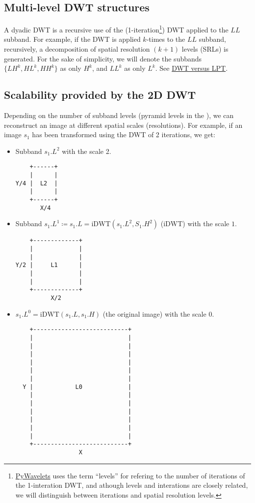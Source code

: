 \subsection{Multi-level DWT structures}
A dyadic DWT is a recursive use of the
(1-iteration\footnote{\href{https://pywavelets.readthedocs.io/en/latest/index.html}{PyWavelets}
  uses the term ``levels'' for refering to the number of iterations of
  the 1-interation DWT, and athough levels and interations are closely
  related, we will distinguish between iterations and spatial
  resolution levels.}) DWT applied to the $LL$ subband. For example,
if the DWT is applied $k$-times to the $LL$ subband, recursively, a
decomposition of spatial resolution $(k+1)$ levels (SRLs) is generated. For
the sake of simplicity, we will denote the subbands $\{LH^k, HL^k,
HH^k\}$ as only $H^k$, and $LL^k$ as only $L^k$. See
\href{https://nbviewer.jupyter.org/github/Sistemas-Multimedia/MCDWT/blob/master/docs/DWT_vs_LPT.ipynb}{DWT
  versus LPT}.

\subsection{Scalability provided by the 2D DWT}
Depending on the number of subband levels (pyramid levels in the
), we can
reconstruct an image at different spatial scales (resolutions). For
example, if an image $s_1$ has been transformed using the DWT of 2
iterations, we get:
\begin{itemize}
\item Subband $s_1.L^2$ with the scale 2.
\begin{verbatim}
    +------+
    |      |
Y/4 |  L2  |
    |      |
    +------+
       X/4
\end{verbatim}
\item Subband $s_1.L^1\coloneqq s_1.L=\text{iDWT}(s_1.L^2, S_1.H^2)$
  ($\text{iDWT}$) with the scale $1$.
\begin{verbatim}
    +-------------+
    |             |
    |             |
Y/2 |     L1      |
    |             | 
    |             |
    +-------------+
          X/2
\end{verbatim}
  
\item $s_1.L^0=\text{iDWT}(s_1.L, s_1.H)$ (the original image) with
  the scale $0$.
\begin{verbatim}
    +---------------------------+
    |                           |
    |                           |
    |                           | 
    |                           |
    |                           |
    |                           |
  Y |            L0             |
    |                           | 
    |                           |
    |                           | 
    |                           | 
    |                           |
    |                           |
    +---------------------------+
                  X
\end{verbatim}
\end{itemize}

